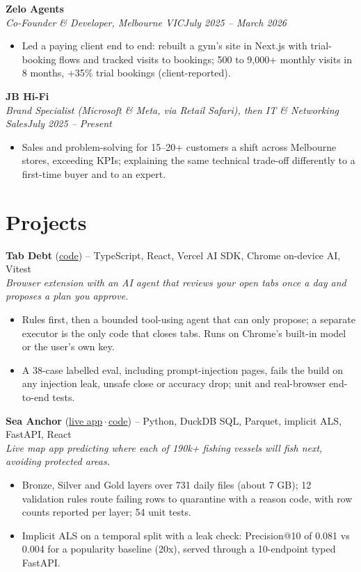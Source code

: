 \documentclass[10pt,a4paper]{article}
\newcommand{\role}[3]{%
  \textbf{#1}\\[-1pt]
  \textit{#2}\hfill\textit{#3}\\[-12pt]}
\newcommand{\project}[4]{%
  \textbf{#1} {\footnotesize(#2)} -- {\small #3}\\[-1pt]
  \textit{\small #4}\\[-12pt]}
\begin{document}
\role{Zelo Agents}{Co-Founder \& Developer, Melbourne VIC}{July 2025 -- March 2026}
\begin{itemize}
  \item Led a paying client end to end: rebuilt a gym's site in Next.js with trial-booking flows and tracked visits to
        bookings; 500 to 9,000+ monthly visits in 8 months, +35\% trial bookings (client-reported).
\end{itemize}

\role{JB Hi-Fi}{Brand Specialist (Microsoft \& Meta, via Retail Safari), then IT \& Networking Sales}{July 2025 -- Present}
\begin{itemize}
  \item Sales and problem-solving for 15--20+ customers a shift across Melbourne stores, exceeding KPIs; explaining the same
        technical trade-off differently to a first-time buyer and to an expert.
\end{itemize}

\section{Projects}

\project{Tab Debt}{\href{https://github.com/Vanamali-Sims/tabDebt}{code}}{TypeScript, React, Vercel AI SDK, Chrome on-device AI, Vitest}
{Browser extension with an AI agent that reviews your open tabs once a day and proposes a plan you approve.}
\begin{itemize}
  \item Rules first, then a bounded tool-using agent that can only propose; a separate executor is the only code that closes
        tabs. Runs on Chrome's built-in model or the user's own key.
  \item A 38-case labelled eval, including prompt-injection pages, fails the build on any injection leak, unsafe close or
        accuracy drop; unit and real-browser end-to-end tests.
\end{itemize}

\project{Sea Anchor}{\href{https://fishing-grounds-recsys.onrender.com/}{live app}\,$\cdot$\,\href{https://github.com/Vanamali-Sims/fishing-grounds-recsys}{code}}{Python, DuckDB SQL, Parquet, implicit ALS, FastAPI, React}
{Live map app predicting where each of 190k+ fishing vessels will fish next, avoiding protected areas.}
\begin{itemize}
  \item Bronze, Silver and Gold layers over 731 daily files (about 7 GB); 12 validation rules route failing rows to
        quarantine with a reason code, with row counts reported per layer; 54 unit tests.
  \item Implicit ALS on a temporal split with a leak check: Precision@10 of 0.081 vs 0.004 for a popularity baseline (20x),
        served through a 10-endpoint typed FastAPI.
\end{itemize}
\end{document}
